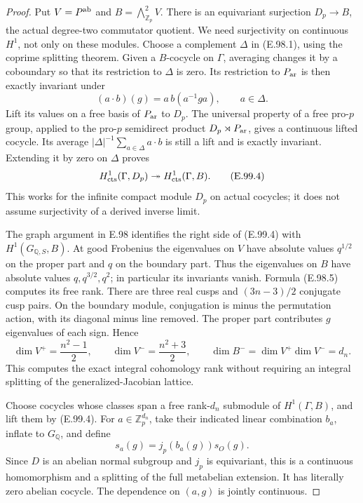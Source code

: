 \begin{proof}
Put \(V=P^{\rm ab}\) and \(B=\bigwedge^2_{\mathbb Z_p}V\).
There is an equivariant surjection \(D_p\to B\), the actual
degree-two commutator quotient.  We need surjectivity on continuous
\(H^1\), not only on these modules.  Choose a complement \(\Delta\)
in (E.98.1), using the coprime splitting theorem.  Given a
\(B\)-cocycle on \(\Gamma\), averaging changes it by a coboundary
so that its restriction to \(\Delta\) is zero.  Its restriction to
\(P_{\rm ar}\) is then exactly invariant under
\[
 (a\cdot b)(g)=a\,b(a^{-1}ga),\qquad a\in\Delta.
\]
Lift its values on a free basis of \(P_{\rm ar}\) to \(D_p\).
The universal property of a free pro-\(p\) group, applied to the
pro-\(p\) semidirect product \(D_p\rtimes P_{\rm ar}\), gives a
continuous lifted cocycle.  Its average
\(|\Delta|^{-1}\sum_{a\in\Delta}a\cdot b\) is still a lift and is
exactly invariant.  Extending it by zero on \(\Delta\) proves
\[
 H^1_{\rm cts}(\Gamma,D_p)\twoheadrightarrow
 H^1_{\rm cts}(\Gamma,B).                                \tag{E.99.4}
\]
This works for the infinite compact module \(D_p\) on actual
cocycles; it does not assume surjectivity of a derived inverse limit.

The graph argument in E.98 identifies the right side of (E.99.4)
with \(H^1(G_{\mathbb Q,S},B)\).  At good Frobenius the eigenvalues
on \(V\) have absolute values \(q^{1/2}\) on the proper part and
\(q\) on the boundary part.  Thus the eigenvalues on \(B\) have
absolute values \(q,q^{3/2},q^2\); in particular its invariants
vanish.  Formula (E.98.5) computes its free rank.
There are three real cusps and \((3n-3)/2\) conjugate cusp pairs.
On the boundary module, conjugation is minus the permutation action,
with its diagonal minus line removed.  The proper part contributes
\(g\) eigenvalues of each sign.  Hence
\[
 \dim V^+=\frac{n^2-1}{2},\qquad
 \dim V^-=\frac{n^2+3}{2},\qquad
 \dim B^-=\dim V^+\dim V^-=d_n.                           \tag{E.99.5}
\]
This computes the exact integral cohomology rank without requiring
an integral splitting of the generalized-Jacobian lattice.

Choose cocycles whose classes span a free rank-\(d_n\) submodule of
\(H^1(\Gamma,B)\), and lift them by (E.99.4).  For
\(a\in\mathbb Z_p^{d_n}\), take their indicated linear combination
\(b_a\), inflate to \(G_{\mathbb Q}\), and define
\[
 s_a(g)=j_p(b_a(g))s_O(g).                                 \tag{E.99.6}
\]
Since \(D\) is an abelian normal subgroup and \(j_p\) is equivariant,
this is a continuous homomorphism and a splitting of the full
metabelian extension.  It has literally zero abelian cocycle.
The dependence on \((a,g)\) is jointly continuous.


\end{proof}
